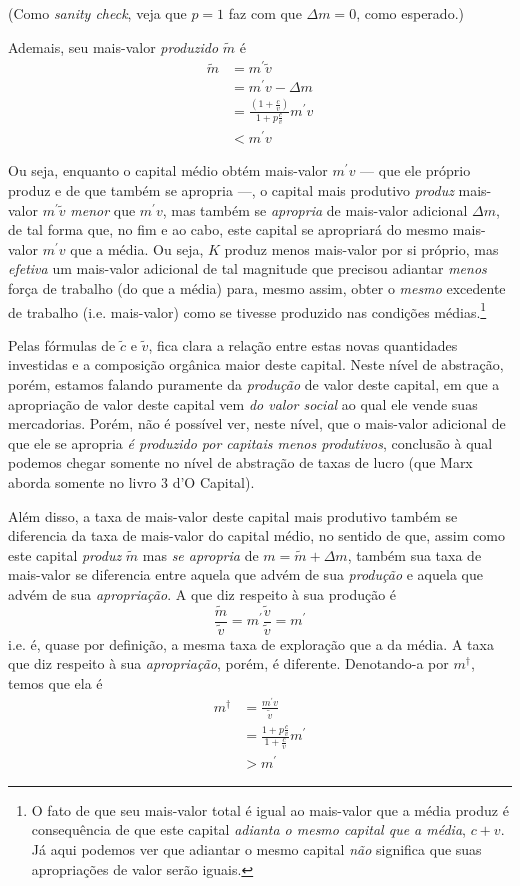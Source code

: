 \documentclass[12pt]{article}
\numberwithin{equation}{section}
\theoremstyle{plain}
\theoremstyle{definition}
\theoremstyle{remark}
\begin{document}
(Como \textit{sanity check}, veja que $p=1$ faz com que $\Delta m=0$, como esperado.)

Ademais, seu mais-valor \textit{produzido} $\tilde{m}$ é 
\begin{align*}
\tilde{m} &= m^{\prime}\tilde{v}  \\
&= m^{\prime}v - \Delta m \\
&= \frac{\left( 1+\frac{c}{v} \right)}{1 + p \frac{c}{v}} m^{\prime} v  \\
&< m^{\prime}v
\end{align*}

Ou seja, enquanto o capital médio obtém mais-valor $m^{\prime}v$ — que ele próprio produz e de que também se apropria —, o capital mais produtivo \textit{produz} mais-valor $m^{\prime} \tilde{v}$ \textit{menor} que $m^{\prime}v$, mas também se \textit{apropria} de mais-valor adicional $\Delta m$, de tal forma que, no fim e ao cabo, este capital se apropriará do mesmo mais-valor $m^{\prime}v$ que a média. Ou seja, $K$ produz menos mais-valor por si próprio, mas \textit{efetiva} um mais-valor adicional de tal magnitude que precisou adiantar \textit{menos} força de trabalho (do que a média) para, mesmo assim, obter o \textit{mesmo} excedente de trabalho (i.e. mais-valor) como se tivesse produzido nas condições médias.\footnote{O fato de que seu mais-valor total é igual ao mais-valor que a média produz é consequência de que este capital \textit{adianta o mesmo capital que a média}, $c+v$. Já aqui podemos ver que adiantar o mesmo capital \textit{não} significa que suas apropriações de valor serão iguais.}

Pelas fórmulas de $\tilde{c}$ e $\tilde{v}$, fica clara a relação entre estas novas quantidades investidas e a composição orgânica maior deste capital. Neste nível de abstração, porém, estamos falando puramente da \textit{produção} de valor deste capital, em que a apropriação de valor deste capital vem \textit{do valor social} ao qual ele vende suas mercadorias. Porém, não é possível ver, neste nível, que o mais-valor adicional de que ele se apropria \textit{é produzido por capitais menos produtivos}, conclusão à qual podemos chegar somente no nível de abstração de taxas de lucro (que Marx aborda somente no livro 3 d'O Capital). 

Além disso, a taxa de mais-valor deste capital mais produtivo também se diferencia da taxa de mais-valor do capital médio, no sentido de que, assim como este capital \textit{produz} $\tilde{m}$ mas \textit{se apropria} de $m = \tilde{m} + \Delta m$, também sua taxa de mais-valor se diferencia entre aquela que advém de sua \textit{produção} e aquela que advém de sua \textit{apropriação}. A que diz respeito à sua produção é
$$
\frac{\tilde{m}}{\tilde{v}} = m^{\prime} \frac{\tilde{v}}{\tilde{v}} = m^{\prime}
$$
i.e. é, quase por definição, a mesma taxa de exploração que a da média. A taxa que diz respeito à sua \textit{apropriação}, porém, é diferente. Denotando-a por $m^{\dagger}$, temos que ela é
\begin{align*}
m^{\dagger} &= \frac{m^{\prime}v}{\tilde{v}}\\
&= \frac{1+p \frac{c}{v}}{1+\frac{c}{v}} m^{\prime} \\
&> m^{\prime}
\end{align*}
\end{document}
